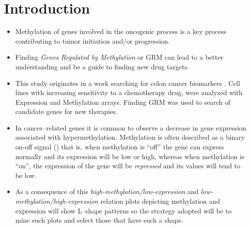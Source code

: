 
\section{Introduction}

\begin{itemize}
\item Methylation %
of genes involved in the oncogenic process is a key process contributing to tumor initiation and/or progression\cite{sadikovic:2008}. 

\item Finding \textit{Genes Regulated by Methylation} or GRM can lead to a better understanding and be a guide to finding new drug targets.

\item This study originates in a work searching for colon cancer biomarkers \cite{bazzocco}. Cell lines with increasing sensitivity to a chemotherapy drug, were analyzed with Expression and Methylation arrays.  Finding GRM was used to search of candidate genes for new therapies.

\item In cancer--related genes it is common to observe a decrease in gene expression associated with hypermethylation. Methylation is often described as a binary on-off signal (\cite{Liu})
that is, when methylation is ``off'' the gene can express normally and
its expression will be low or high, whereas when methylation
is ``on'', the expression of the gene will be \emph{repressed} and its
values will tend to be low.

\item As a consequence of this \emph{high-methylation/low-expression} and
\emph{low-methylation/high-expression} relation plots depicting 
methylation and expression will show L--shape patterns so the
strategy adopted will be to mine such plots and select those that
have such a shape.

\end{itemize}

